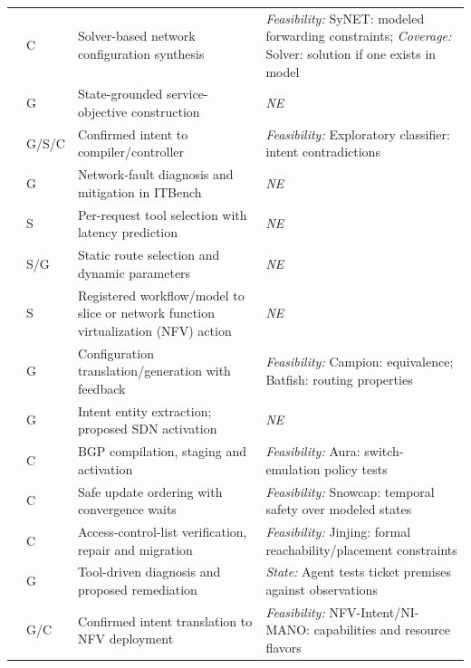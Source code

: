 \begin{longtable}{>{\raggedright\arraybackslash}p{.09\soklitwidth}>{\centering\arraybackslash}p{.07\soklitwidth}>{\raggedright\arraybackslash}p{.36\soklitwidth}>{\raggedright\arraybackslash}p{.48\soklitwidth}}
\addlinespace[1pt]
\cite{el-hassany2017networkwide} & C & Solver-based network configuration synthesis & \emph{Feasibility:} SyNET: modeled forwarding constraints; \emph{Coverage:} Solver: solution if one exists in model \\
\addlinespace[1pt]
\cite{islam2026intent} & G & State-grounded service-objective construction & \textit{NE} \\
\addlinespace[1pt]
\cite{jacobs2021hey} & G/S/C & Confirmed intent to compiler/controller & \emph{Feasibility:} Exploratory classifier: intent contradictions \\
\addlinespace[1pt]
\cite{jha2025itbench} & G & Network-fault diagnosis and mitigation in ITBench & \textit{NE} \\
\addlinespace[1pt]
\cite{li2025jaunt} & S & Per-request tool selection with latency prediction & \textit{NE} \\
\addlinespace[1pt]
\cite{e0arxiv260822644,manias2024semantic} & S/G & Static route selection and dynamic parameters & \textit{NE} \\
\addlinespace[1pt]
\cite{mcnamara2023nlp} & S & Registered workflow/model to slice or network function virtualization (NFV) action & \textit{NE} \\
\addlinespace[1pt]
\cite{mondal2023what} & G & Configuration translation/generation with feedback & \emph{Feasibility:} Campion: equivalence; Batfish: routing properties \\
\addlinespace[1pt]
\cite{njah2023intentbased} & G & Intent entity extraction; proposed SDN activation & \textit{NE} \\
\addlinespace[1pt]
\cite{ramanathan2023practical} & C & BGP compilation, staging and activation & \emph{Feasibility:} Aura: switch-emulation policy tests \\
\addlinespace[1pt]
\cite{schneider2021snowcap} & C & Safe update ordering with convergence waits & \emph{Feasibility:} Snowcap: temporal safety over modeled states \\
\addlinespace[1pt]
\cite{tian2019safely} & C & Access-control-list verification, repair and migration & \emph{Feasibility:} Jinjing: formal reachability/placement constraints \\
\addlinespace[1pt]
\cite{tseng2026faultbench} & G & Tool-driven diagnosis and proposed remediation & \emph{State:} Agent tests ticket premises against observations \\
\addlinespace[1pt]
\cite{e0sourceS02,tu2025intentbased} & G/C & Confirmed intent translation to NFV deployment & \emph{Feasibility:} NFV-Intent/NI-MANO: capabilities and resource flavors \\

\end{longtable}
